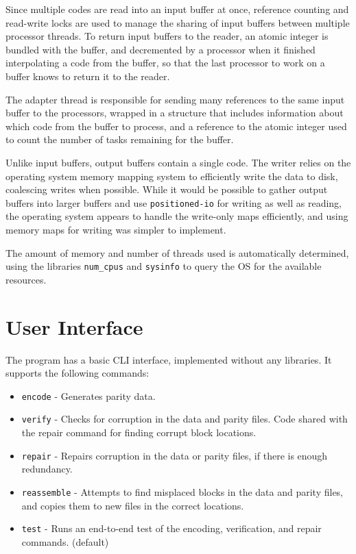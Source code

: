 Since multiple codes are read into an input buffer at once, reference counting and read-write locks are used to manage the sharing of input buffers between multiple processor threads.
To return input buffers to the reader, an atomic integer is bundled with the buffer, and decremented by a processor when it finished interpolating a code from the buffer,
so that the last processor to work on a buffer knows to return it to the reader.

The adapter thread is responsible for sending many references to the same input buffer to the processors,
wrapped in a structure that includes information about which code from the buffer to process,
and a reference to the atomic integer used to count the number of tasks remaining for the buffer.

Unlike input buffers, output buffers contain a single code. The writer relies on the operating system memory mapping system to efficiently write the data to disk, coalescing writes when possible.
While it would be possible to gather output buffers into larger buffers and use \texttt{positioned-io} for writing as well as reading, the operating system appears to handle the write-only maps efficiently,
and using memory maps for writing was simpler to implement.

The amount of memory and number of threads used is automatically determined, using the libraries \texttt{num\_cpus} and \texttt{sysinfo} to query the OS for the available resources.

\section{User Interface}

The program has a basic CLI interface, implemented without any libraries.
It supports the following commands:
\begin{itemize}
    \item \texttt{encode} - Generates parity data.
    \item \texttt{verify} - Checks for corruption in the data and parity files. Code shared with the repair command for finding corrupt block locations.
    \item \texttt{repair} - Repairs corruption in the data or parity files, if there is enough redundancy.
    \item \texttt{reassemble} - Attempts to find misplaced blocks in the data and parity files, and copies them to new files in the correct locations.
    \item \texttt{test} - Runs an end-to-end test of the encoding, verification, and repair commands. (default)
\end{itemize}

